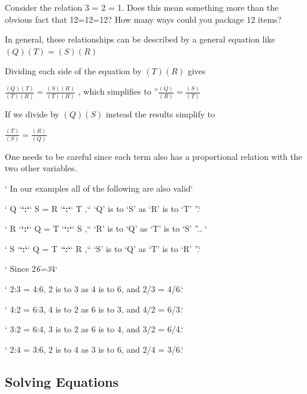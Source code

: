 Consider the relation 3 = 2 = 1. Does this mean something more than the obvious
fact that 12=12=12? How many ways could you package 12 items?



In general, these relationships can be described by a general equation like
\textbf{$(Q)(T) = (S)(R)$}



Dividing each side of the equation by \textbf{$(T)(R)$} gives



$\frac{(Q)(T)}{(T)(R)} = \frac{(S)(R)}{(T)(R)}$ , which simplifies to ''$\frac{(Q)}{(R)} = \frac{(S)}{(T)}$



If we divide by \textbf{$(Q)(S)$} instead the results simplify to



\textbf{$\frac{(T)}{(S)} = \frac{(R)}{(Q)}$}



One needs to be careful since each term also has a proportional relation with the two
other variables.



` In our examples all of the following are also valid`



` Q `\textbf{`:`}` S = R `\textbf{`:`}` T ,“ ‘Q’ is to ‘S’ as ‘R’ is to ‘T’ ”.`



` R `\textbf{`:`}` Q = T `\textbf{`:`}` S ,“ ‘R’ is to ‘Q’ as ‘T’ is to ‘S’ ”..  `



` S `\textbf{`:`}` Q = T `\textbf{`:`}` R ,“ ‘S’ is to ‘Q’ as ‘T’ is to ‘R’ ”.`



` Since 2\textit{6=3}4`



` 2:3 = 4:6, 2 is to 3 as 4 is to 6, and 2/3 = 4/6.`



` 4:2 = 6:3, 4 is to 2 as 6 is to 3, and 4/2 = 6/3.`



` 3:2 = 6:4, 3 is to 2 as 6 is to 4, and 3/2 = 6/4.`



` 2:4 = 3:6, 2 is to 4 as 3 is to 6, and 2/4 = 3/6.`




\subsection{Solving Equations}
\label{sss:solv-cf61}




